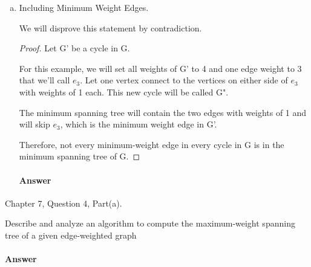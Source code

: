 \documentclass{article}
\begin{document}
\begin{enumerate}[(a)]
    \item Including Minimum Weight Edges.

        We will disprove this statement by contradiction.

        \begin{proof}
            Let G' be a cycle in G.

            For this example, we will set all weights of G' to 4 and one edge
            weight to 3 that we'll call $e_{3}$. Let one vertex connect to the vertices on either side
            of $e_{3}$ with weights of 1 each. This new cycle will be called G".

            The minimum spanning tree will contain the two edges with weights of 1
            and will skip $e_{3}$, which is the minimum weight edge in G'.

            Therefore, not every minimum-weight edge in every cycle in G is in
            the minimum spanning tree of G.
        \end{proof}

        \paragraph{Answer}
        \todo{}

\end{enumerate}


\collab{\todo{}}

Chapter 7, Question 4, Part(a).

Describe and analyze an algorithm to compute the maximum-weight
spanning tree of a given edge-weighted graph

\paragraph{Answer}
\todo{}
\end{document}
